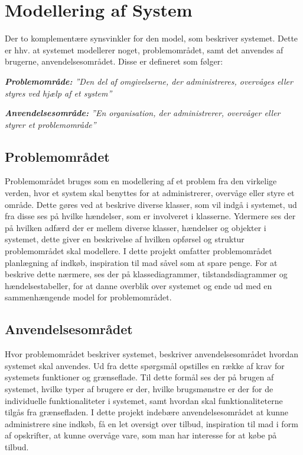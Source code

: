 \section{Modellering af System}
Der to komplementære synsvinkler for den model, som beskriver systemet. 
Dette er hhv. at systemet modellerer noget, problemområdet, samt det anvendes af brugerne, anvendelsesområdet. 
Disse er defineret som følger:

\textit{\textbf{Problemområde:} ''Den del af omgivelserne, der administreres, overvåges eller styres ved hjælp af et system''}

\textit{\textbf{Anvendelsesområde:} ''En organisation, der administrerer, overvåger eller styrer et problemområde''}\citep{OOA&D2001}
\subsection{Problemområdet}
Problemområdet bruges som en modellering af et problem fra den virkelige verden, hvor et system skal benyttes for at administrerer, overvåge eller styre et område. 
Dette gøres ved at beskrive diverse klasser, som vil indgå i systemet, ud fra disse ses på hvilke hændelser, som er involveret i klasserne.
Ydermere ses der på hvilken adfærd der er mellem diverse klasser, hændelser og objekter i systemet, dette giver en beskrivelse af hvilken opførsel og struktur problemområdet skal modellere.
I dette projekt omfatter problemområdet planlægning af indkøb, inspiration til mad såvel som at spare penge.
For at beskrive dette nærmere, ses der på klassediagrammer, tilstandsdiagrammer og hændelsestabeller, for at danne overblik over systemet og ende ud med en sammenhængende model for problemområdet.
\subsection{Anvendelsesområdet}
Hvor problemområdet beskriver systemet, beskriver anvendelsesområdet hvordan systemet skal anvendes.
Ud fra dette spørgsmål opstilles en række af krav for systemets funktioner og grænseflade.
Til dette formål ses der på brugen af systemet, hvilke typer af brugere er der, hvilke brugsmønstre er der for de individuelle funktionaliteter i systemet, samt hvordan skal funktionaliteterne tilgås fra grænsefladen.
I dette projekt indebære anvendelsesområdet at kunne administrere sine indkøb, få en let oversigt over tilbud, inspiration til mad i form af opskrifter, at kunne overvåge vare, som man har interesse for at købe på tilbud.

